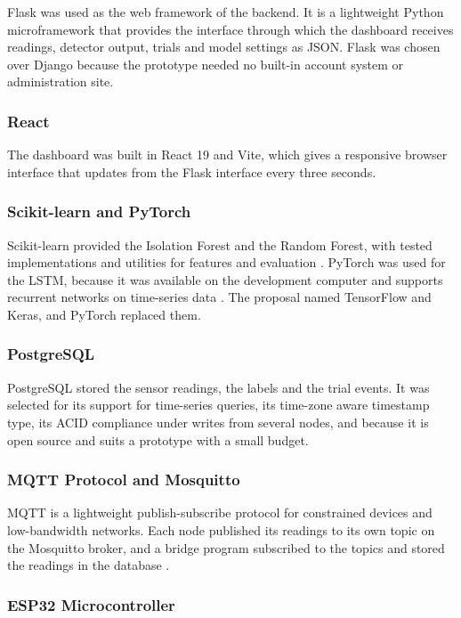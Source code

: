 \documentclass[12pt, a4paper]{article}
\begin{document}
Flask was used as the web framework of the backend. It is a lightweight Python microframework that provides the interface through which the dashboard receives readings, detector output, trials and model settings as JSON. Flask was chosen over Django because the prototype needed no built-in account system or administration site.

\subsubsection{React}

The dashboard was built in React 19 and Vite, which gives a responsive browser interface that updates from the Flask interface every three seconds.

\subsubsection{Scikit-learn and PyTorch}

Scikit-learn provided the Isolation Forest and the Random Forest, with tested implementations and utilities for features and evaluation \citep{sathiyamoorthy2025}. PyTorch was used for the LSTM, because it was available on the development computer and supports recurrent networks on time-series data \citep{bao2025}. The proposal named TensorFlow and Keras, and PyTorch replaced them.

\subsubsection{PostgreSQL}

PostgreSQL stored the sensor readings, the labels and the trial events. It was selected for its support for time-series queries, its time-zone aware timestamp type, its ACID compliance under writes from several nodes, and because it is open source and suits a prototype with a small budget.

\subsubsection{MQTT Protocol and Mosquitto}

MQTT is a lightweight publish-subscribe protocol for constrained devices and low-bandwidth networks. Each node published its readings to its own topic on the Mosquitto broker, and a bridge program subscribed to the topics and stored the readings in the database \citep{nageye2025}.

\subsubsection{ESP32 Microcontroller}
\end{document}
